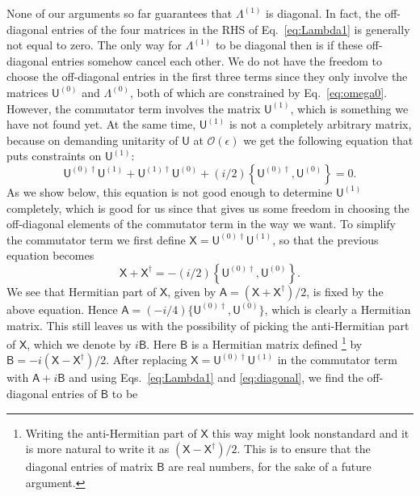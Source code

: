 None of our arguments so far guarantees that $\Lambda^{(1)}$ is diagonal.
In fact, the off-diagonal entries of the four matrices in the RHS of Eq.~\eqref{eq:Lambda1} is generally not equal to zero.
The only way for $\Lambda^{(1)}$ to be diagonal then is if these off-diagonal entries somehow cancel each other.
We do not have the freedom to choose the off-diagonal entries in the first three terms since they only involve the matrices $\mathsf{U}^{(0)}$ and $\Lambda^{(0)}$, both of which are constrained by Eq.~\eqref{eq:omega0}.
However, the commutator term involves the matrix $\mathsf{U}^{(1)}$, which is something we have not found yet.
At the same time, $\mathsf{U}^{(1)}$ is not a completely arbitrary matrix, because on demanding unitarity of $\mathsf{U}$ at $\mathcal{O}(\epsilon)$ we get the following equation that puts constraints on $\mathsf{U}^{(1)}$:
%
\begin{equation}
  \mathsf{U}^{(0)\dagger}\mathsf{U}^{(1)} + \mathsf{U}^{(1)\dagger}\mathsf{U}^{(0)} + (i/2)\left\{\mathsf{U}^{(0)\dagger}, \mathsf{U}^{(0)}\right\}= 0.
  \label{eq:unitarity}
\end{equation}
%
As we show below, this equation is not good enough to determine $\mathsf{U}^{(1)}$ completely, which is good for us since that gives us some freedom in choosing the off-diagonal elements of the commutator term in the way we want.
To simplify the commutator term we first define $\mathsf{X} = \mathsf{U}^{(0)\dagger}\mathsf{U}^{(1)}$, so that the previous equation becomes
%
\begin{equation}
  \mathsf{X} + \mathsf{X}^{\dagger} = -(i/2)\left\{\mathsf{U}^{(0)\dagger}, \mathsf{U}^{(0)}\right\}.
\end{equation}
%
We see that Hermitian part of $\mathsf{X}$, given by $\mathsf{A} = (\mathsf{X} + \mathsf{X}^{\dagger})/2$, is fixed by the above equation.
Hence $\mathsf{A} = (-i/4)\{\mathsf{U}^{(0)\dagger},\mathsf{U}^{(0)}\}$, which is clearly a Hermitian matrix.
This still leaves us with the possibility of picking the anti-Hermitian part of $\mathsf{X}$, which we denote by $i\mathsf{B}$. Here $\mathsf{B}$ is a Hermitian matrix defined%
\footnote{%
  Writing the anti-Hermitian part of $\mathsf{X}$ this way might look nonstandard and it is more natural to write it as $(\mathsf{X} - \mathsf{X}^{\dagger})/2$.
  This is to ensure that the diagonal entries of matrix $\mathsf{B}$ are real numbers, for the sake of a future argument.
}
by $\mathsf{B} = -i(\mathsf{X} - \mathsf{X}^{\dagger})/2$.
After replacing $\mathsf{X} = \mathsf{U}^{(0)\dagger}\mathsf{U}^{(1)}$ in the commutator term with $\mathsf{A} + i\mathsf{B}$ and using Eqs.~\eqref{eq:Lambda1} and \eqref{eq:diagonal}, we find the off-diagonal entries of $\mathsf{B}$ to be
